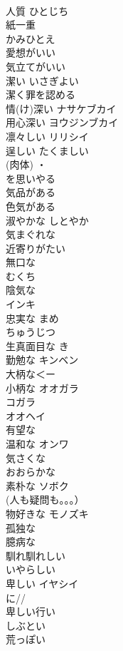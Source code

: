 \documentclass[8pt]{extreport}
\begin{document}
\begin{CJK}{UTF8}{min}
\\	人質	ひとじち 
\\	紙一重	
\\	かみひとえ
\\	愛想がいい	
\\	気立てがいい	
\\	潔い	いさぎよい 
\\	潔く罪を認める
\\	情(け)深い	ナサケブカイ 
\\	用心深い	ヨウジンブカイ 
\\	凛々しい	リリシイ 
\\	逞しい	たくましい 
\\	(肉体) ・
\\	を思いやる	
\\	気品がある	
\\	色気がある	
\\	淑やかな	しとやか 
\\	気まぐれな	
\\	近寄りがたい	
\\	無口な	
\\	むくち
\\	陰気な	
\\	インキ
\\	忠実な	まめ 
\\	ちゅうじつ 
\\	生真面目な	き 
\\	勤勉な	キンベン 
\\	大柄な＜ー
\\	小柄な	オオガラ 
\\	コガラ 
\\	オオヘイ
\\	有望な	
\\	温和な	オンワ 
\\	気さくな	
\\	おおらかな	
\\	素朴な	ソボク 
\\	(人も疑問も。。。）
\\	物好きな	モノズキ 
\\	孤独な	
\\	臆病な	
\\	馴れ馴れしい	
\\	いやらしい	
\\	卑しい	イヤシイ 
\\	に//
\\	卑しい行い 
\\	しぶとい	
\\	荒っぽい	

\end{CJK}
\end{document}

